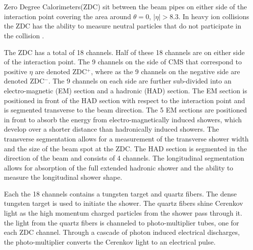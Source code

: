   \DIFdelbegin {}\DIFdelend \DIFaddbegin \section{} 
    \DIFaddend Zero Degree Calorimeters(ZDC) \DIFaddbegin {}\DIFaddend sit between the beam pipes on either side of the interaction point 
      covering the area around $\theta = 0$, $|\eta| > 8.3$.
    In heavy ion collisions the ZDC has the ability to measure neutral particles 
    	that do not participate in the collision \cite{tCmsE}.
    \DIFdelbegin {}\DIFdelend 

    The ZDC has a total of 18 channels.
        Half of these 18 channels are on either side of the interaction point.
    The 9 channels on the side of CMS that correspond to positive $\eta$
      are denoted ZDC$^{+}$, where as the 9 channels on the negative side are
      denoted ZDC$^{-}$.
    The 9 channels on each side are further sub-divided into an electro-magnetic  
      (EM) section and a hadronic (HAD) section.
    The EM section is positioned in front of the HAD section with respect to the 
      interaction point and is segmented transverse to the beam direction.
    The 5 EM sections are positioned in front to absorb the energy from 
      electro-magnetically induced showers, which develop over a shorter distance 
      than hadronically induced showers.
    The transverse segmentation allows for a measurement of the transverse shower
      width and the size of the beam spot at the ZDC.
    The HAD section is segmented in the direction of the beam and consists of 4
      channels.
    The longitudinal segmentation allows for absorption of the full extended 
      hadronic shower and the ability to measure the longitudinal shower shape.

    Each the 18 channels contains a tungsten target and quartz fibers.
    The dense tungsten target is used to initiate the shower.
    The quartz fibers shine Cerenkov light as the high momentum charged particles
      from the shower pass through it. 
    the light from the quartz fibers is channeled to photo-multiplier tubes, one 
      for each ZDC channel. 
    Through a cascade of photon induced electrical discharges, the photo-multiplier
      converts the Cerenkov light to an electrical pulse. 

